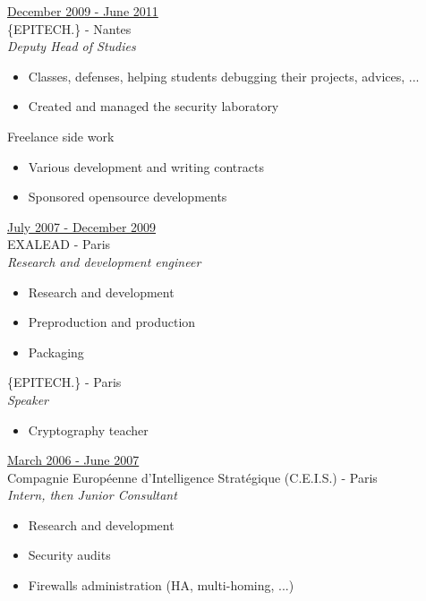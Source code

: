 \documentclass[a4paper,10pt]{letter}
\begin{document}
\begin{description}
\item{\underline{December 2009 - June 2011}}\\
  \{EPITECH.\} - Nantes\\
  \textit{Deputy Head of Studies}
  \begin{itemize}
  \item Classes, defenses, helping students debugging their projects, advices, ...
  \item Created and managed the security laboratory\\
  \end{itemize}

  Freelance side work
  \begin{itemize}
  \item Various development and writing contracts
  \item Sponsored opensource developments\\
  \end{itemize}

\item{\underline{July 2007 - December 2009}}\\
  EXALEAD - Paris\\
  \textit{Research and development engineer}
  \begin{itemize}
  \item Research and development 
  \item Preproduction and production
  \item Packaging\\
  \end{itemize}

  \{EPITECH.\} - Paris\\
  \textit{Speaker}
  \begin{itemize}
  \item Cryptography teacher\\
  \end{itemize}

\item{\underline{March 2006 - June 2007}} \\
  Compagnie Europ\'eenne d'Intelligence Strat\'egique (C.E.I.S.) - Paris\\
  \textit{Intern, then Junior Consultant}
  \begin{itemize}
  \item Research and development
  \item Security audits
  \item Firewalls administration (HA, multi-homing, ...)\\
  \end{itemize}
\end{description}
\end{document}
